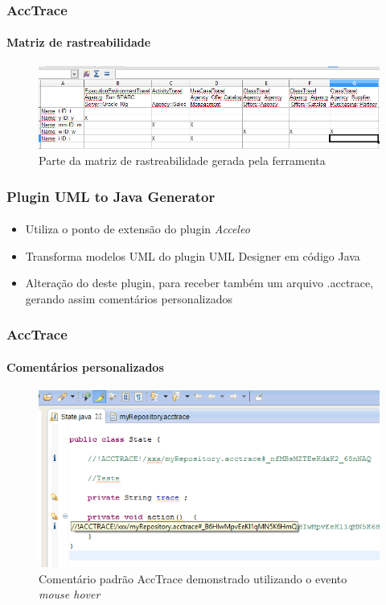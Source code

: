\documentclass{beamer}
\begin{document}
\begin{frame}
\frametitle{AccTrace}
\framesubtitle{Matriz de rastreabilidade}

\begin{figure}[htbp] \centering
	\includegraphics[width=\textwidth,height=.65\textheight,keepaspectratio]{./img/matrixpart.png}
	\caption{Parte da matriz de rastreabilidade gerada pela ferramenta}
	\label{fig:matrixpart}
\end{figure}

\end{frame}

\begin{frame}
\frametitle{Plugin UML to Java Generator}
\framesubtitle{}

\begin{itemize}
  \item Utiliza o ponto de extensão do plugin \textit{Acceleo} \cite{acceleo:13}
  \item Transforma modelos UML do plugin UML Designer em código Java
  \item Alteração do deste plugin, para receber também um arquivo .acctrace, gerando assim comentários personalizados
\end{itemize}

\end{frame}

\begin{frame}
\frametitle{AccTrace}
\framesubtitle{Comentários personalizados}

\begin{figure}[htbp] \centering
	\includegraphics[width=\textwidth,height=.65\textheight,keepaspectratio]{./img/acctracecomment.png}
	\caption{Comentário padrão AccTrace demonstrado utilizando o evento \textit{mouse hover}}
	\label{fig:acctracecomment}
\end{figure}

\end{frame}
\end{document}
